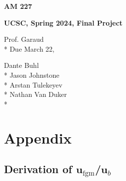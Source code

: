 \documentclass{article} \usepackage{amsfonts,amsmath, amssymb, xcolor, amsthm,}
\begin{document}
\newcommand{\bs}[1]{\boldsymbol{#1}}
\newcommand{\bmp}[1]{\begin{minipage}{#1\textwidth}}
\newcommand{\emp}{\end{minipage}}
\newcommand{\R}{\mathbb{R}}
\newcommand{\C}{\mathbb{C}}
\newcommand{\N}{\mathcal{N}}
\newcommand{\I}{\mathrm{I}}
\newcommand{\K}{\bs{\mathrm{K}}}
\newcommand{\m}{\bs{\mu}_*}
\newcommand{\s}{\bs{\Sigma}_*}
\newcommand{\dt}{\Delta t}
\newcommand{\tr}[1]{\text{Tr}(#1)}
\newcommand{\Tr}[1]{\text{Tr}(#1)}


\newtheorem{lemma}{Lemma} \newtheorem{sublemma}{Lemma}[lemma] \begin{flushleft}
\textbf{AM 227}

\textbf{UCSC, Spring 2024, Final Project}

Prof. Garaud \\* Due March 22,

\bigskip Dante Buhl\\* Jason Johnstone\\* Arstan Tulekeyev\\* Nathan Van
Duker\\* \end{flushleft}


    \section*{Appendix} \setcounter{section}{1} \subsection{Derivation of
    $\bm{u}_{\text{fgm}}$/$\bm{u}_b$}
\end{document}
